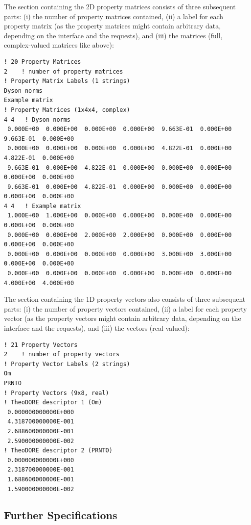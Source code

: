 \documentclass[a4paper,10pt,DIV=15,openany,twoside=false]{scrbook}
\newenvironment{example}{
  \setlength{\OuterFrameSep}{3pt}
  \vspace{0mm}
  \definecolor{shadecolor}{HTML}{E4F4FF}
  \begin{shaded}
}{
  \end{shaded}
}
\begin{document}
The section containing the 2D property matrices consists of three subsequent parts: (i) the number of property matrices contained, (ii) a label for each property matrix (as the property matrices might contain arbitrary data, depending on the interface and the requests), and (iii) the matrices (full, complex-valued matrices like above):
\begin{example}
  \begin{verbatim}
! 20 Property Matrices
2    ! number of property matrices
! Property Matrix Labels (1 strings)
Dyson norms
Example matrix
! Property Matrices (1x4x4, complex)
4 4   ! Dyson norms
 0.000E+00  0.000E+00  0.000E+00  0.000E+00  9.663E-01  0.000E+00  9.663E-01  0.000E+00 
 0.000E+00  0.000E+00  0.000E+00  0.000E+00  4.822E-01  0.000E+00  4.822E-01  0.000E+00 
 9.663E-01  0.000E+00  4.822E-01  0.000E+00  0.000E+00  0.000E+00  0.000E+00  0.000E+00 
 9.663E-01  0.000E+00  4.822E-01  0.000E+00  0.000E+00  0.000E+00  0.000E+00  0.000E+00 
4 4   ! Example matrix
 1.000E+00  1.000E+00  0.000E+00  0.000E+00  0.000E+00  0.000E+00  0.000E+00  0.000E+00 
 0.000E+00  0.000E+00  2.000E+00  2.000E+00  0.000E+00  0.000E+00  0.000E+00  0.000E+00 
 0.000E+00  0.000E+00  0.000E+00  0.000E+00  3.000E+00  3.000E+00  0.000E+00  0.000E+00 
 0.000E+00  0.000E+00  0.000E+00  0.000E+00  0.000E+00  0.000E+00  4.000E+00  4.000E+00 
\end{verbatim}
\end{example}

The section containing the 1D property vectors also consists of three subsequent parts: (i) the number of property vectors contained, (ii) a label for each property vector (as the property vectors might contain arbitrary data, depending on the interface and the requests), and (iii) the vectors (real-valued):
\begin{example}
  \begin{verbatim}
! 21 Property Vectors
2    ! number of property vectors
! Property Vector Labels (2 strings)
Om
PRNTO
! Property Vectors (9x8, real)
! TheoDORE descriptor 1 (Om)
 0.000000000000E+000
 4.318700000000E-001
 2.688600000000E-001
 2.590000000000E-002
! TheoDORE descriptor 2 (PRNTO)
 0.000000000000E+000
 2.318700000000E-001
 1.688600000000E-001
 1.590000000000E-002
\end{verbatim}
\end{example}



\subsection{Further Specifications}
\end{document}
